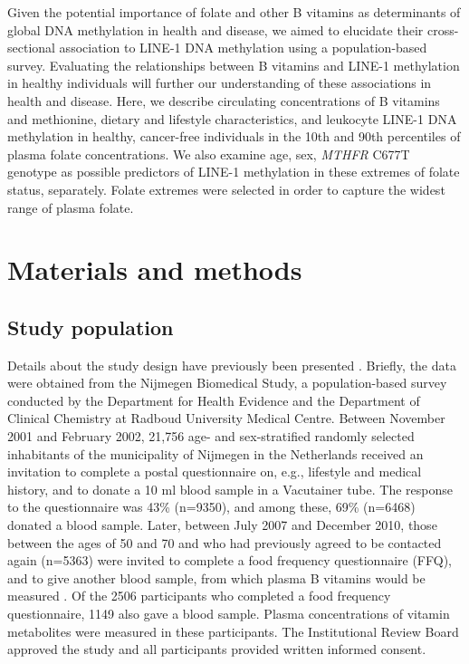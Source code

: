 \noindent Given the potential importance of folate and other B vitamins as determinants of global DNA methylation in health and disease, we aimed to elucidate their cross-sectional association to LINE-1 DNA methylation using a population-based survey. Evaluating the relationships between B vitamins and LINE-1 methylation in healthy individuals will further our understanding of these associations in health and disease. Here, we describe circulating concentrations of B vitamins and methionine, dietary and lifestyle characteristics, and leukocyte LINE-1 DNA methylation in healthy, cancer-free individuals in the 10th and 90th percentiles of plasma folate concentrations. We also examine age, sex, \emph{MTHFR} C677T genotype as possible predictors of LINE-1 methylation in these extremes of folate status, separately. Folate extremes were selected in order to capture the widest range of plasma folate. 

\section[]{Materials and methods} %
\subsection[]{Study population}
\noindent Details about the study design have previously been presented \cite{c321}. Briefly, the data were obtained from the Nijmegen Biomedical Study, a population-based survey conducted by the Department for Health Evidence and the Department of Clinical Chemistry at Radboud University Medical Centre. Between November 2001 and February 2002, 21,756 age- and sex-stratified randomly selected inhabitants of the municipality of Nijmegen in the Netherlands received an invitation to complete a postal questionnaire on, e.g., lifestyle and medical history, and to donate a 10 ml blood sample in a Vacutainer tube. The response to the questionnaire was 43\% (n=9350), and among these, 69\% (n=6468) donated a blood sample. Later, between July 2007 and December 2010, those between the ages of 50 and 70 and who had previously agreed to be contacted again (n=5363) were invited to complete a food frequency questionnaire (FFQ), and to give another blood sample, from which plasma B vitamins would be measured \cite{c322}. Of 
the 2506 participants who completed a food frequency questionnaire, 1149 also gave a blood sample. Plasma concentrations of vitamin metabolites were measured in these participants. The Institutional Review Board approved the study and all participants provided written informed consent.

